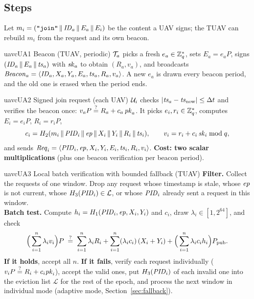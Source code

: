 \subsection{Steps}
Let $m_i=(\texttt{"join"}\,\|\,\mathit{ID}_a\,\|\, E_a\,\|\, E_i)$ be the content a UAV signs; the TUAV can rebuild $m_i$ from the request and its own beacon.

\begin{stepbox}{uavc}{UA1 \;Beacon (TUAV, periodic)}
$\mathcal{T}_a$ picks a fresh $e_a\in\mathbb{Z}_q^{*}$, sets $E_a=e_aP$, signs $(\mathit{ID}_a\,\|\, E_a\,\|\,\mathit{ts}_a)$ with $\mathit{sk}_a$ to obtain $(R_a,v_a)$, and broadcasts
$\mathit{Beacon}_a=\langle\mathit{ID}_a,X_a,Y_a,E_a,\mathit{ts}_a,R_a,v_a\rangle$. A new $e_a$ is drawn every beacon period, and the old one is erased when the period ends.
\end{stepbox}

\begin{stepbox}{uavc}{UA2 \;Signed join request (each UAV)}
$\mathcal{U}_i$ checks $|\mathit{ts}_a-\mathit{ts}_{\mathrm{now}}|\le\Delta t$ and verifies the beacon once: $v_aP\overset{?}{=}R_a+c_a\,\mathit{pk}_a$.
It picks $e_i,r_i\in\mathbb{Z}_q^{*}$, computes $E_i=e_iP$, $R_i=r_iP$,
\[
  c_i=H_2(m_i\,\|\,\mathit{PID}_i\,\|\,\mathit{ep}\,\|\, X_i\,\|\, Y_i\,\|\, R_i\,\|\,\mathit{ts}_i),\qquad v_i=r_i+c_i\,\mathit{sk}_i \bmod q,
\]
and sends $\mathit{Req}_i=\langle\mathit{PID}_i,\mathit{ep},X_i,Y_i,E_i,\mathit{ts}_i,R_i,v_i\rangle$.
\textbf{Cost: two scalar multiplications} (plus one beacon verification per beacon period).
\end{stepbox}

\begin{stepbox}{uavc}{UA3 \;Local batch verification with bounded fallback (TUAV)}
\textbf{Filter.} Collect the requests of one window. Drop any request whose timestamp is stale, whose $\mathit{ep}$ is not current, whose $H_3(\mathit{PID}_i)\in\mathcal{L}$,
or whose $\mathit{PID}_i$ already sent a request in this window.\\[2pt]
\textbf{Batch test.} Compute $h_i=H_1(\mathit{PID}_i,\mathit{ep},X_i,Y_i)$ and $c_i$, draw $\lambda_i\in[1,2^{64}]$, and check
\begin{equation}
  \Big(\sum_{i=1}^{n}\lambda_iv_i\Big)P\;\overset{?}{=}\;\sum_{i=1}^{n}\lambda_iR_i+\sum_{i=1}^{n}(\lambda_ic_i)\,(X_i+Y_i)+\Big(\sum_{i=1}^{n}\lambda_ic_ih_i\Big)P_{\mathrm{pub}} .\label{eq:bv}
\end{equation}
\textbf{If it holds}, accept all $n$. \textbf{If it fails}, verify each request individually ($v_iP\overset{?}{=}R_i+c_i\mathit{pk}_i$), accept the valid ones,
put $H_3(\mathit{PID}_i)$ of each invalid one into the eviction list $\mathcal{L}$ for the rest of the epoch, and process the next window in individual mode
(adaptive mode, Section~\ref{sec:fallback}).
\end{stepbox}

